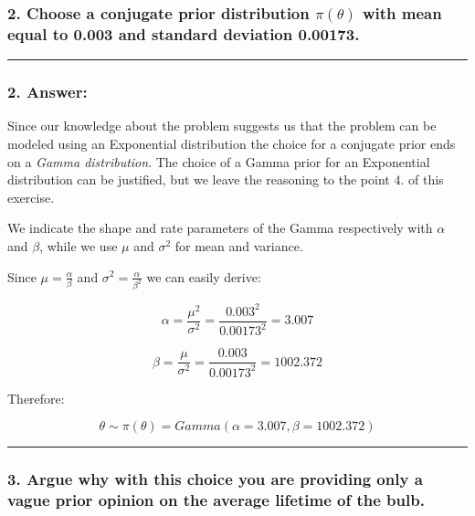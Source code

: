 \documentclass[
]{article}
\begin{document}
\hypertarget{choose-a-conjugate-prior-distribution-pitheta-with-mean-equal-to-0.003-and-standard-deviation-0.00173.}{%
\subsubsection{\texorpdfstring{2. Choose a conjugate prior distribution
\(\pi(\theta)\) with mean equal to 0.003 and standard deviation
0.00173.}{2. Choose a conjugate prior distribution \textbackslash pi(\textbackslash theta) with mean equal to 0.003 and standard deviation 0.00173.}}\label{choose-a-conjugate-prior-distribution-pitheta-with-mean-equal-to-0.003-and-standard-deviation-0.00173.}}

\begin{center}\rule{0.5\linewidth}{0.5pt}\end{center}

\hypertarget{answer-5}{%
\subsubsection{2. Answer:}\label{answer-5}}

Since our knowledge about the problem suggests us that the problem can
be modeled using an Exponential distribution the choice for a conjugate
prior ends on a \emph{Gamma distribution}. The choice of a Gamma prior
for an Exponential distribution can be justified, but we leave the
reasoning to the point \(4.\) of this exercise.

We indicate the shape and rate parameters of the Gamma respectively with
\(\alpha\) and \(\beta\), while we use \(\mu\) and \(\sigma^2\) for mean
and variance.

Since \(\mu = \frac{\alpha}{\beta}\) and
\(\sigma^2 = \frac{\alpha}{\beta^2}\) we can easily derive:

\[
\alpha = \frac{\mu^2}{\sigma^2} = \frac{0.003^2}{0.00173^2} = 3.007
\]

\[
\beta = \frac{\mu}{\sigma^2} = \frac{0.003}{0.00173^2} = 1002.372
\]

Therefore:

\[
\theta \sim \pi(\theta) = Gamma(\alpha = 3.007, \beta = 1002.372)
\]

\begin{center}\rule{0.5\linewidth}{0.5pt}\end{center}

\hypertarget{argue-why-with-this-choice-you-are-providing-only-a-vague-prior-opinion-on-the-average-lifetime-of-the-bulb.}{%
\subsubsection{3. Argue why with this choice you are providing only a
vague prior opinion on the average lifetime of the
bulb.}\label{argue-why-with-this-choice-you-are-providing-only-a-vague-prior-opinion-on-the-average-lifetime-of-the-bulb.}}
\end{document}
